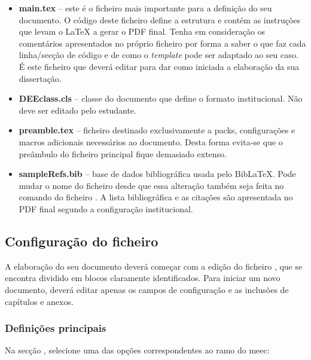 \begin{itemize}
\item \textbf{main.tex} -- este é o ficheiro mais importante para a definição do seu documento. O código deste ficheiro define a estrutura e contém as instruções que levam o \LaTeX{} a gerar o PDF final. Tenha em consideração os comentários apresentados no próprio ficheiro por forma a saber o que faz cada linha/secção de código e de como o \textit{template} pode ser adaptado ao seu caso. É este ficheiro que deverá editar para dar como iniciada a elaboração da sua dissertação.

\item \textbf{DEEclass.cls} -- classe do documento que define o formato institucional. Não deve ser editado pelo estudante.

\item \textbf{preamble.tex} -- ficheiro destinado exclusivamente a \glspl{pack}, configurações e macros adicionais necessários ao documento. Desta forma evita-se que o preâmbulo do ficheiro principal  fique demasiado extenso. 

\item \textbf{sampleRefs.bib} -- base de dados bibliográfica usada pelo Bib\LaTeX{}. Pode mudar o nome do ficheiro desde que essa alteração também seja feita no comando \verb|| do ficheiro . A lista bibliográfica e as citações são apresentada no PDF final segundo a configuração institucional.

\end{itemize}


\subsection{Configuração do ficheiro }
\label{subsec:Ch2.2.3}

A elaboração do seu documento deverá começar com a edição do ficheiro , que se encontra dividido em blocos claramente identificados. Para iniciar um novo documento, deverá editar apenas os campos de configuração e as inclusões de capítulos e anexos.

\subsubsection*{Definições principais}

Na secção , selecione uma das opções correspondentes ao ramo do \ac{meec}:

